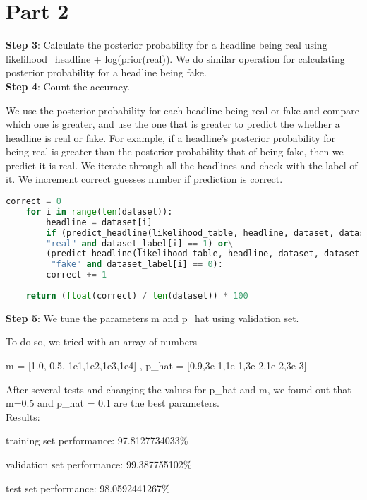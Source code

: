\documentclass{article}
\newcommand{\enterProblemHeader}[1]{
}
\newcommand{\exitProblemHeader}[1]{
}
\newcounter{homeworkProblemCounter} %
\newcommand{\homeworkProblemName}{}
\newenvironment{homeworkProblem}[1][Problem \arabic{homeworkProblemCounter}]{ %
	\stepcounter{homeworkProblemCounter} %
	\renewcommand{\homeworkProblemName}{#1} %
	\section{\homeworkProblemName} %
	\enterProblemHeader{\homeworkProblemName} %
}{
	\exitProblemHeader{\homeworkProblemName} %
}
\begin{document}
\begin{homeworkProblem}[Part 2]
		\textbf{Step 3}: Calculate the posterior probability for a headline being real using likelihood\_headline + log(prior(real)). We do similar operation for calculating posterior probability for a headline being fake. \\
		
		\textbf{Step 4}: Count the accuracy. 
		
		We use the posterior probability for each headline being real or fake and compare which one is greater, and use the one that is greater to predict the whether a headline is real or fake. For example, if a headline's posterior probability for being real is greater than the posterior probability that of being fake, then we predict it is real. We iterate through all the headlines and check with the label of it. We increment correct guesses number if prediction is correct. \\
\begin{lstlisting}[language=Python, caption=Calculate performance for a dataset]	
	correct = 0
	for i in range(len(dataset)):
		headline = dataset[i]
		if (predict_headline(likelihood_table, headline, dataset, dataset_label) == 
		"real" and dataset_label[i] == 1) or\
		(predict_headline(likelihood_table, headline, dataset, dataset_label) ==
		 "fake" and dataset_label[i] == 0):
		correct += 1
	
	return (float(correct) / len(dataset)) * 100
\end{lstlisting}
		\textbf{Step 5}: We tune the parameters m and p\_hat using validation set. 
		
		To do so, we tried with an array of numbers 
		
		m = [1.0, 0.5, 1e1,1e2,1e3,1e4] ,	p\_hat = [0.9,3e-1,1e-1,3e-2,1e-2,3e-3]
		
		After several tests and changing the values for p\_hat and m, we found out that m=0.5 and p\_hat = 0.1 are the best parameters. \\
		
		Results:
		
		training set performance: 97.8127734033\%
		
		validation set performance: 99.387755102\%
		
		test set performance: 98.0592441267\%

		
	\end{homeworkProblem}
	\clearpage
	
\end{document}
